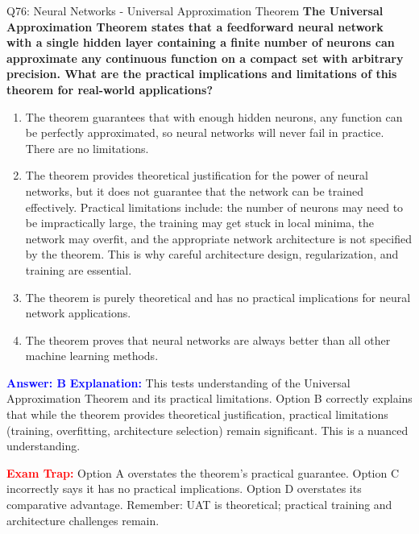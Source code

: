 \documentclass[8pt]{beamer}
\begin{document}
	\begin{frame}{Q76: Neural Networks - Universal Approximation Theorem}
		\fontsize{6.5}{7.5}\selectfont
		\textbf{The Universal Approximation Theorem states that a feedforward neural network with a single hidden layer containing a finite number of neurons can approximate any continuous function on a compact set with arbitrary precision. What are the practical implications and limitations of this theorem for real-world applications?}
		
		\begin{enumerate}
			\item The theorem guarantees that with enough hidden neurons, any function can be perfectly approximated, so neural networks will never fail in practice. There are no limitations.
			\item The theorem provides theoretical justification for the power of neural networks, but it does not guarantee that the network can be trained effectively. Practical limitations include: the number of neurons may need to be impractically large, the training may get stuck in local minima, the network may overfit, and the appropriate network architecture is not specified by the theorem. This is why careful architecture design, regularization, and training are essential.
			\item The theorem is purely theoretical and has no practical implications for neural network applications.
			\item The theorem proves that neural networks are always better than all other machine learning methods.
		\end{enumerate}
		
		\vspace{0.1cm}
		\textcolor{blue}{\textbf{Answer: B}}
		\vspace{0.1cm}
		\textcolor{blue}{\textbf{Explanation:}} This tests understanding of the Universal Approximation Theorem and its practical limitations. Option B correctly explains that while the theorem provides theoretical justification, practical limitations (training, overfitting, architecture selection) remain significant. This is a nuanced understanding.
		
		\textcolor{red}{\textbf{Exam Trap:}} Option A overstates the theorem's practical guarantee. Option C incorrectly says it has no practical implications. Option D overstates its comparative advantage. Remember: UAT is theoretical; practical training and architecture challenges remain.
	\end{frame}
	
\end{document}
